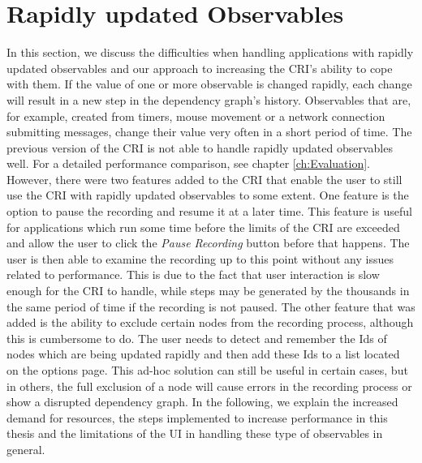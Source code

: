 \section{Rapidly updated Observables}
\label{sec:RapidlyUpdatedObservables}
In this section, we discuss the difficulties when handling applications with rapidly updated observables and our approach to increasing the CRI's ability to cope with them. If the value of one or more observable is changed rapidly, each change will result in a new step in the dependency graph's history. Observables that are, for example, created from timers, mouse movement or a network connection submitting messages, change their value very often in a short period of time. The previous version of the CRI is not able to handle rapidly updated observables well. For a detailed performance comparison, see chapter \ref{ch:Evaluation}. However, there were two features added to the CRI that enable the user to still use the CRI with rapidly updated observables to some extent. One feature is the option to pause the recording and resume it at a later time. This feature is useful for applications which run some time before the limits of the CRI are exceeded and allow the user to click the \emph{Pause Recording} button before that happens. The user is then able to examine the recording up to this point without any issues related to performance. This is due to the fact that user interaction is slow enough for the CRI to handle, while steps may be generated by the thousands in the same period of time if the recording is not paused. The other feature that was added is the ability to exclude certain nodes from the recording process, although this is cumbersome to do. The user needs to detect and remember the Ids of nodes which are being updated rapidly and then add these Ids to a list located on the options page. This ad-hoc solution can still be useful in certain cases, but in others, the full exclusion of a node will cause errors in the recording process or show a disrupted dependency graph. In the following, we explain the increased demand for resources, the steps implemented to increase performance in this thesis and the limitations of the UI in handling these type of observables in general.

